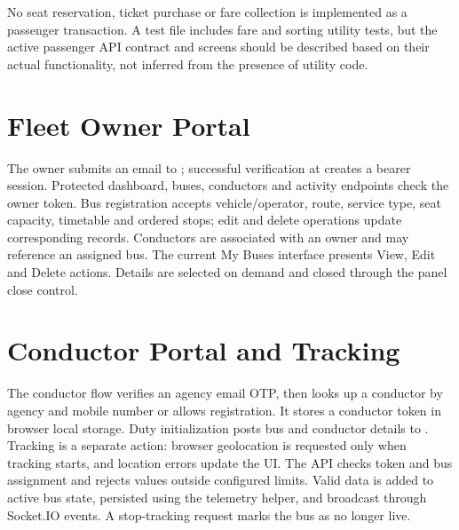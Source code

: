 \documentclass[12pt,a4paper]{report}
\begin{document}
No seat reservation, ticket purchase or fare collection is implemented as a passenger transaction. A test file includes fare and sorting utility tests, but the active passenger API contract and screens should be described based on their actual functionality, not inferred from the presence of utility code.

\section{Fleet Owner Portal}
The owner submits an email to ; successful verification at  creates a bearer session. Protected dashboard, buses, conductors and activity endpoints check the owner token. Bus registration accepts vehicle/operator, route, service type, seat capacity, timetable and ordered stops; edit and delete operations update corresponding records. Conductors are associated with an owner and may reference an assigned bus. The current My Buses interface presents View, Edit and Delete actions. Details are selected on demand and closed through the panel close control.

\section{Conductor Portal and Tracking}
The conductor flow verifies an agency email OTP, then looks up a conductor by agency and mobile number or allows registration. It stores a conductor token in browser local storage. Duty initialization posts bus and conductor details to . Tracking is a separate action: browser geolocation is requested only when tracking starts, and location errors update the UI. The API checks token and bus assignment and rejects values outside configured limits. Valid data is added to active bus state, persisted using the telemetry helper, and broadcast through Socket.IO events. A stop-tracking request marks the bus as no longer live.
\end{document}
